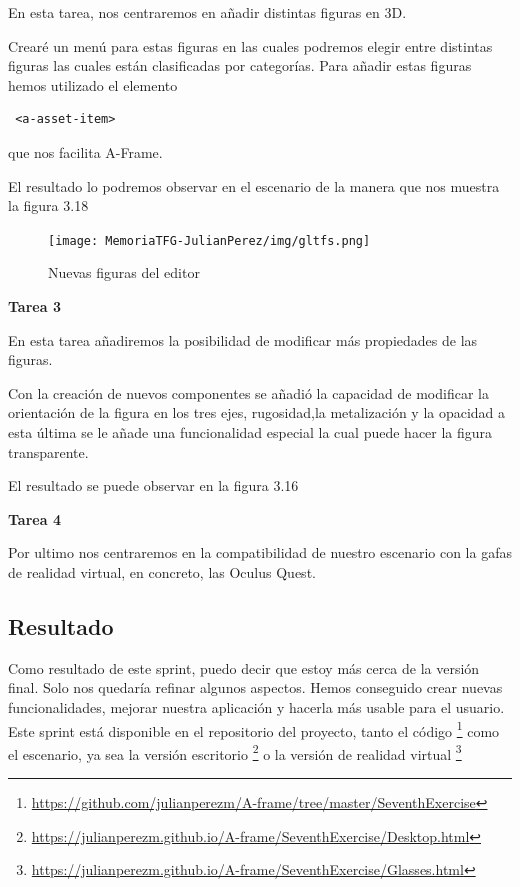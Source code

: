 \documentclass[a4paper, 12pt]{book}
\begin{document}
En esta tarea, nos centraremos en añadir distintas figuras en 3D.

Crearé un menú para estas figuras en las cuales podremos elegir entre distintas figuras las cuales están clasificadas por categorías. Para añadir estas figuras hemos utilizado el elemento \begin{verbatim} <a-asset-item>\end{verbatim} que nos facilita A-Frame.

El resultado lo podremos observar en el escenario de la manera que nos muestra la figura 3.18

\begin{figure}[H]
  \centering
  \texttt{[image: MemoriaTFG-JulianPerez/img/gltfs.png]}
  \caption{Nuevas figuras del editor}\label{fig}
\end{figure}

\textbf{Tarea 3}

En esta tarea añadiremos la posibilidad de modificar más propiedades de las figuras.

Con la creación de nuevos componentes se añadió la capacidad de modificar la orientación de la figura en los tres ejes, rugosidad,la metalización y la opacidad a esta última se le añade una funcionalidad especial la cual puede hacer la figura transparente.

El resultado se puede observar en la figura 3.16

\textbf{Tarea 4}

Por ultimo nos centraremos en la compatibilidad de nuestro escenario con la gafas de realidad virtual, en concreto, las Oculus Quest. 

\subsection{Resultado}

Como resultado de este sprint, puedo decir que estoy más cerca de la versión final. Solo nos quedaría refinar algunos aspectos. Hemos conseguido crear nuevas funcionalidades, mejorar nuestra aplicación y hacerla más usable para el usuario. Este sprint está disponible en el repositorio del proyecto, tanto el código \footnote{\url{https://github.com/julianperezm/A-frame/tree/master/SeventhExercise}} como el escenario, ya sea la versión escritorio \footnote{\url{https://julianperezm.github.io/A-frame/SeventhExercise/Desktop.html}} o la versión de realidad virtual \footnote{\url{https://julianperezm.github.io/A-frame/SeventhExercise/Glasses.html}}
\end{document}
